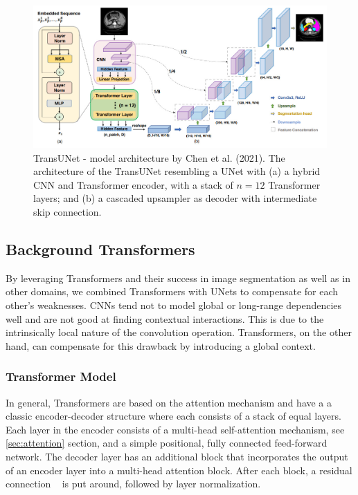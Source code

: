 \documentclass[10pt,conference,compsocconf]{IEEEtran}
\begin{document}
\begin{figure}[tbp]
  \centering
  \includegraphics[scale=0.45]{images/trans_unet_model.png}
  \caption{TransUNet - model architecture by Chen et al. (2021). The architecture of the TransUNet resembling a UNet with (a) a hybrid CNN and Transformer encoder, with a stack of $n=12$ Transformer layers; and (b) a cascaded upsampler as decoder with intermediate skip connection.}
  \label{fig:trans_unet_model}
\end{figure}

\subsection{Background Transformers}

By leveraging Transformers and their success in image segmentation as well as in other domains, we combined Transformers with UNets to compensate for each other's weaknesses. CNNs tend not to model global or long-range dependencies well and are not good at finding contextual interactions. This is due to the intrinsically local nature of the convolution operation. Transformers, on the other hand, can compensate for this drawback by introducing a global context.

\subsubsection{Transformer Model}
In general, Transformers are based on the attention mechanism \cite{Vaswani2017} and have a a classic encoder-decoder structure where each consists of a stack of equal layers. \textbf{\textbf{}} Each layer in the encoder consists of a multi-head self-attention mechanism, see \ref{sec:attention} section, and a simple positional, fully connected feed-forward network. The decoder layer has an additional block that incorporates the output of an encoder layer into a multi-head attention block. After each block, a residual connection ~\cite{7780459} is put around, followed by layer normalization.
\end{document}
